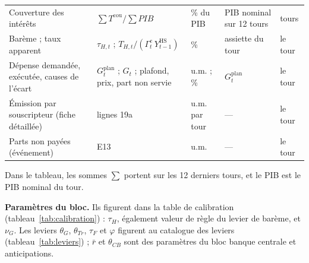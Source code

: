 \documentclass[11pt,a4paper]{article}
\begin{document}
\begin{center}
\begin{longtable}{>{\raggedright\arraybackslash}p{2.8cm}>{\raggedright\arraybackslash}p{4.7cm}>{\raggedright\arraybackslash}p{1.8cm}>{\raggedright\arraybackslash}p{2.6cm}>{\raggedright\arraybackslash}p{2.5cm}}
Couverture des intérêts & $\sum T^{\mathrm{cou}}/\sum \mathit{PIB}$ & \% du PIB & PIB nominal sur 12 tours & 12 tours\\
Barème ; taux apparent & $\tau_{H,t}$ ; $T_{H,t}/(\Gamma^e_t\,Y^{\mathrm{HS}}_{t-1})$ & \% & assiette du tour & le tour\\
Dépense demandée, exécutée, causes de l'écart & $G^{\mathrm{plan}}_t$ ; $G_t$ ; plafond, prix, part non servie & u.m. ; \% & $G^{\mathrm{plan}}_t$ & le tour\\
Émission par souscripteur (fiche détaillée) & lignes 19a & u.m. par tour & --- & le tour\\
Parts non payées (événement) & E13 & u.m. & --- & le tour\\
\bottomrule
\end{longtable}
\end{center}
Dans le tableau, les sommes $\sum$ portent sur les 12 derniers tours, et le PIB est le PIB nominal du tour.

\textbf{Paramètres du bloc.} Ils figurent dans la table de calibration (tableau~\ref{tab:calibration}) : $\tau_H$, également valeur de règle du levier de barème, et $\nu_G$. Les leviers $\theta_G$, $\theta_{\mathit{Tr}}$, $\tau_F$ et $\varphi$ figurent au catalogue des leviers (tableau~\ref{tab:leviers}) ; $\bar r$ et $\theta_{\mathit{CB}}$ sont des paramètres du bloc banque centrale et anticipations.
\end{document}
